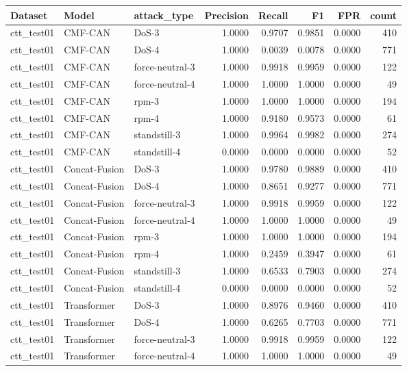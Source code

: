 \begin{tabular}{lllrrrrr}
\toprule
Dataset & Model & attack\_type & Precision & Recall & F1 & FPR & count \\
\midrule
ctt\_test01 & CMF-CAN & DoS-3 & 1.0000 & 0.9707 & 0.9851 & 0.0000 & 410 \\
ctt\_test01 & CMF-CAN & DoS-4 & 1.0000 & 0.0039 & 0.0078 & 0.0000 & 771 \\
ctt\_test01 & CMF-CAN & force-neutral-3 & 1.0000 & 0.9918 & 0.9959 & 0.0000 & 122 \\
ctt\_test01 & CMF-CAN & force-neutral-4 & 1.0000 & 1.0000 & 1.0000 & 0.0000 & 49 \\
ctt\_test01 & CMF-CAN & rpm-3 & 1.0000 & 1.0000 & 1.0000 & 0.0000 & 194 \\
ctt\_test01 & CMF-CAN & rpm-4 & 1.0000 & 0.9180 & 0.9573 & 0.0000 & 61 \\
ctt\_test01 & CMF-CAN & standstill-3 & 1.0000 & 0.9964 & 0.9982 & 0.0000 & 274 \\
ctt\_test01 & CMF-CAN & standstill-4 & 0.0000 & 0.0000 & 0.0000 & 0.0000 & 52 \\
ctt\_test01 & Concat-Fusion & DoS-3 & 1.0000 & 0.9780 & 0.9889 & 0.0000 & 410 \\
ctt\_test01 & Concat-Fusion & DoS-4 & 1.0000 & 0.8651 & 0.9277 & 0.0000 & 771 \\
ctt\_test01 & Concat-Fusion & force-neutral-3 & 1.0000 & 0.9918 & 0.9959 & 0.0000 & 122 \\
ctt\_test01 & Concat-Fusion & force-neutral-4 & 1.0000 & 1.0000 & 1.0000 & 0.0000 & 49 \\
ctt\_test01 & Concat-Fusion & rpm-3 & 1.0000 & 1.0000 & 1.0000 & 0.0000 & 194 \\
ctt\_test01 & Concat-Fusion & rpm-4 & 1.0000 & 0.2459 & 0.3947 & 0.0000 & 61 \\
ctt\_test01 & Concat-Fusion & standstill-3 & 1.0000 & 0.6533 & 0.7903 & 0.0000 & 274 \\
ctt\_test01 & Concat-Fusion & standstill-4 & 0.0000 & 0.0000 & 0.0000 & 0.0000 & 52 \\
ctt\_test01 & Transformer & DoS-3 & 1.0000 & 0.8976 & 0.9460 & 0.0000 & 410 \\
ctt\_test01 & Transformer & DoS-4 & 1.0000 & 0.6265 & 0.7703 & 0.0000 & 771 \\
ctt\_test01 & Transformer & force-neutral-3 & 1.0000 & 0.9918 & 0.9959 & 0.0000 & 122 \\
ctt\_test01 & Transformer & force-neutral-4 & 1.0000 & 1.0000 & 1.0000 & 0.0000 & 49 \\

\end{tabular}

